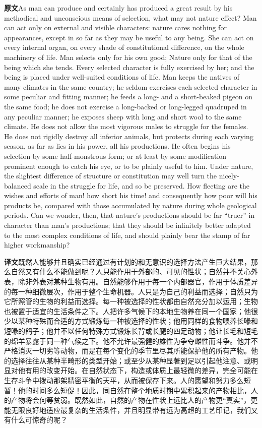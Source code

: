 \documentclass[UTF8,zihao=-4]{ctexart}
\newcommand{\BodyFont}{\fontsize{10.5pt}{15.5pt}\selectfont}
\newcommand{\origlabel}{\textbf{原文}\quad}
\newcommand{\translabel}{\textbf{译文}\quad}
\newenvironment{enblock}{\par\noindent\begingroup\BodyFont\origlabel}{\par\endgroup}
\newenvironment{zhblock}{\par\noindent\begingroup\BodyFont\translabel}{\par\endgroup\vspace{0.35em}}
\newcommand{\pair}[2]{\begin{enblock}#1\end{enblock}\begin{zhblock}#2\end{zhblock}}
\begin{document}
\pair{As man can produce and certainly has produced a great result by his methodical and unconscious means of selection, what may not nature effect? Man can act only on external and visible characters: nature cares nothing for appearances, except in so far as they may be useful to any being. She can act on every internal organ, on every shade of constitutional difference, on the whole machinery of life. Man selects only for his own good; Nature only for that of the being which she tends. Every selected character is fully exercised by her; and the being is placed under well-suited conditions of life. Man keeps the natives of many climates in the same country; he seldom exercises each selected character in some peculiar and fitting manner; he feeds a long- and a short-beaked pigeon on the same food; he does not exercise a long-backed or long-legged quadruped in any peculiar manner; he exposes sheep with long and short wool to the same climate. He does not allow the most vigorous males to struggle for the females. He does not rigidly destroy all inferior animals, but protects during each varying season, as far as lies in his power, all his productions. He often begins his selection by some half-monstrous form; or at least by some modification prominent enough to catch his eye, or to be plainly useful to him. Under nature, the slightest difference of structure or constitution may well turn the nicely-balanced scale in the struggle for life, and so be preserved. How fleeting are the wishes and efforts of man! how short his time! and consequently how poor will his products be, compared with those accumulated by nature during whole geological periods. Can we wonder, then, that nature's productions should be far “truer” in character than man's productions; that they should be infinitely better adapted to the most complex conditions of life, and should plainly bear the stamp of far higher workmanship?}{既然人能够并且确实已经通过有计划的和无意识的选择方法产生巨大结果，那么自然又有什么不能做到呢？人只能作用于外部的、可见的性状；自然并不关心外表，除非外表对某种生物有用。自然能够作用于每一个内部器官，作用于体质差异的每一种细微层次，作用于整个生命机器。人只是为自己的利益而选择；自然只为它所照管的生物的利益而选择。每一种被选择的性状都由自然充分加以运用；生物也被置于适宜的生活条件之下。人把许多气候下的本地生物养在同一个国家；他很少以某种特殊而合适的方式锻炼每一种被选择的性状；他用同样的食物喂养长喙和短喙的鸽子；他并不以任何特殊方式锻炼长背或长腿的四足动物；他让长毛和短毛的绵羊暴露于同一种气候之下。他不允许最强健的雄性为争夺雌性而斗争。他并不严格消灭一切劣等动物，而是在每个变化的季节里尽其所能保护他的所有产物。他的选择往往从某种半畸形的类型开始；或至少从某种显著到足以引起他注意、或明显对他有用的改变开始。在自然状态下，构造或体质上最轻微的差异，完全可能在生存斗争中拨动那架精密平衡的天平，从而被保存下来。人的愿望和努力多么短暂！他的时间多么短促！因此，同自然在整个地质时期中累积起来的产物相比，人的产物将会何等贫弱。既然如此，自然的产物在性状上远比人的产物更“真实”，更能无限良好地适应最复杂的生活条件，并且明显带有远为高超的工艺印记，我们又有什么可惊奇的呢？}
\end{document}
